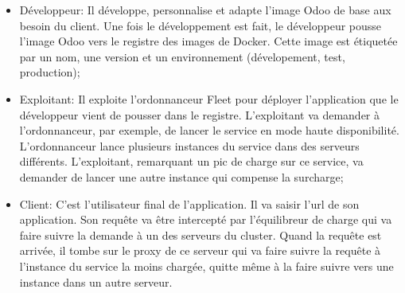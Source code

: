 \begin{onehalfspace}
\begin{itemize}
 	\item Développeur: Il développe, personnalise et adapte l'image Odoo de base aux besoin du client. Une fois le développement est fait, le développeur pousse l'image Odoo vers le registre des images de Docker. Cette image est étiquetée par un nom, une version et un environnement (dévelopement, test, production);
 	\item Exploitant: Il exploite l'ordonnanceur Fleet pour déployer l'application que le développeur vient de pousser dans le registre. L'exploitant va demander à l'ordonnanceur, par exemple, de lancer le service en mode haute disponibilité. L'ordonnanceur lance plusieurs instances du service dans des serveurs différents. L'exploitant, remarquant un pic de charge sur ce service, va demander de lancer une autre instance qui compense la surcharge;
 	\item Client: C'est l'utilisateur final de l'application. Il va saisir l'\acrshort{url} de son application. Son requête va être intercepté par l'équilibreur de charge qui va faire suivre la demande à un des serveurs du cluster. Quand la requête est arrivée, il tombe sur le proxy de ce serveur qui va faire suivre la requête à l'instance du service la moins chargée, quitte même à la faire suivre vers une instance dans un autre serveur.
 \end{itemize} 






\end{onehalfspace}
